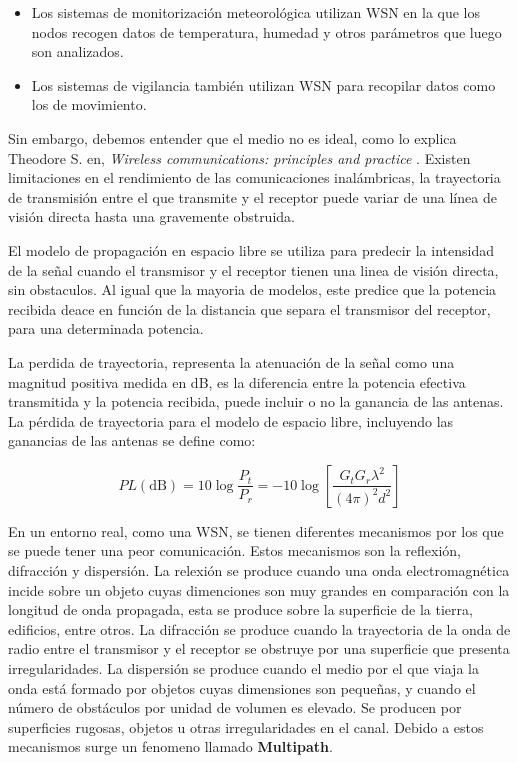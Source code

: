     \begin{itemize}
        \item Los sistemas de monitorización meteorológica utilizan WSN en la que los nodos recogen datos de temperatura, humedad y otros parámetros que luego son analizados.
        \item Los sistemas de vigilancia también utilizan WSN para recopilar datos como los de movimiento. 
    \end{itemize}

    Sin embargo, debemos entender que el medio no es ideal, como lo explica Theodore S. en, 
    \textit{Wireless communications: principles and practice} \cite{rappaport_wireless_2009}. Existen limitaciones en el rendimiento de las comunicaciones
    inalámbricas, la trayectoria de transmisión entre el que transmite y el receptor puede variar de una línea de visión directa hasta una 
    gravemente obstruida. 

    El modelo de propagación en espacio libre se utiliza para predecir la intensidad de la señal cuando el transmisor 
    y el receptor tienen una linea de visión directa, sin obstaculos. Al igual que la mayoria de modelos, este 
    predice que la potencia recibida deace en función de la distancia que separa el transmisor del receptor, para una 
    determinada potencia. 

    La perdida de trayectoria, representa la atenuación de la señal como una magnitud positiva medida en dB, es la diferencia
    entre la potencia efectiva transmitida y la potencia recibida, puede incluir o no la ganancia de las antenas. La pérdida de 
    trayectoria para el modelo de espacio libre, incluyendo las ganancias de las antenas se define como:

    \begin{equation}
        PL(\text{dB}) = 10\log\frac{P_t}{P_r} = -10\log\left[ \frac{G_t G_r \lambda^2}{(4\pi)^2 d^2} \right]
    \end{equation}

    En un entorno real, como una WSN, se tienen diferentes mecanismos por los que se puede tener una peor comunicación. Estos mecanismos son la reflexión, difracción y dispersión.
    La relexión se produce cuando una onda electromagnética incide sobre un objeto cuyas dimenciones son muy grandes en comparación con la longitud de onda propagada, esta se produce
    sobre la superficie de la tierra, edificios, entre otros. La difracción se produce cuando la trayectoria de la onda de radio entre el transmisor y el receptor se obstruye por una 
    superficie que presenta irregularidades. La dispersión se produce cuando el medio por el que viaja la onda está formado por objetos cuyas dimensiones son pequeñas, y cuando el número
    de obstáculos por unidad de volumen es elevado. Se producen por superficies rugosas, objetos u otras irregularidades en el canal. Debido a estos mecanismos surge un fenomeno llamado \textbf{Multipath}.

